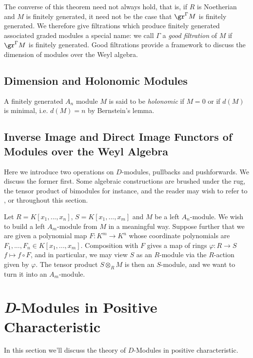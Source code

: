 The converse of this theorem need not always hold, that is, if $R$ is Noetherian and $M$ is finitely generated, it need not be the case that $\gr^{\Gamma}M$ is finitely generated. We therefore give filtrations which produce finitely generated associated graded modules a special name: we call $\Gamma$ a \emph{good filtration} of $M$ if $\gr^\Gamma M$ is finitely generated. Good filtrations provide a framework to discuss the dimension of modules over the Weyl algebra.

\subsection{Dimension and Holonomic Modules}

\begin{defn}\label{defn:holonomic}
	A finitely generated $A_n$ module $M$ is said to be \emph{holonomic} if $M = 0$ or if $d(M)$ is minimal, i.e. $d(M) = n$ by Bernstein's lemma.
\end{defn}

\subsection{Inverse Image and Direct Image Functors of Modules over the Weyl Algebra}
Here we introduce two operations on $D$-modules, pullbacks and pushforwards. We discuss the former first. Some algebraic constructions are brushed under the rug, the tensor product of bimodules for instance, and the reader may wish to refer to \cite{d-mod-primer}, \cite{d-mod_ps_rt} or \cite{ginzburg_d-mod} throughout this section.

Let $R = K[x_1,...,x_n]$, $S = K[x_1,...,x_m]$ and $M$ be a left $A_n$-module. We wish to build a left $A_m$-module from $M$ in a meaningful way. Suppose further that we are given a polynomial map $F:K^m\to K^n$ whose coordinate polynomials are $F_1,...,F_n\in K[x_1,...,x_m]$. Composition with $F$ gives a map of rings $\varphi:R\to S$ $f\mapsto f\circ F$, and in particular, we may view $S$ as an $R$-module via the $R$-action given by $\varphi$. The tensor product $S\otimes_R M$ is then an $S$-module, and we want to turn it into an $A_m$-module.

\section{\emph{D}-Modules in Positive Characteristic}
In this section we'll discuss the theory of $D$-Modules in positive characteristic. 
